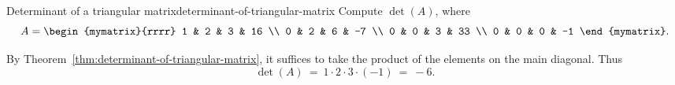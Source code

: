 \begin{example}{Determinant of a triangular matrix}{determinant-of-triangular-matrix}
  Compute $\det(A)$, where
  \begin{equation*}
    A=\begin{mymatrix}{rrrr}
      1 & 2 & 3 & 16 \\
      0 & 2 & 6 & -7 \\
      0 & 0 & 3 & 33 \\
      0 & 0 & 0 & -1
    \end{mymatrix}.
  \end{equation*}
\end{example}

\begin{solution}
  By Theorem~\ref{thm:determinant-of-triangular-matrix}, it suffices
  to take the product of the elements on the main diagonal. Thus
  \begin{equation*}
    \det (A) ~=~ 1\cdot 2\cdot 3\cdot (-1) ~=~ -6.
  \end{equation*}
\end{solution}

